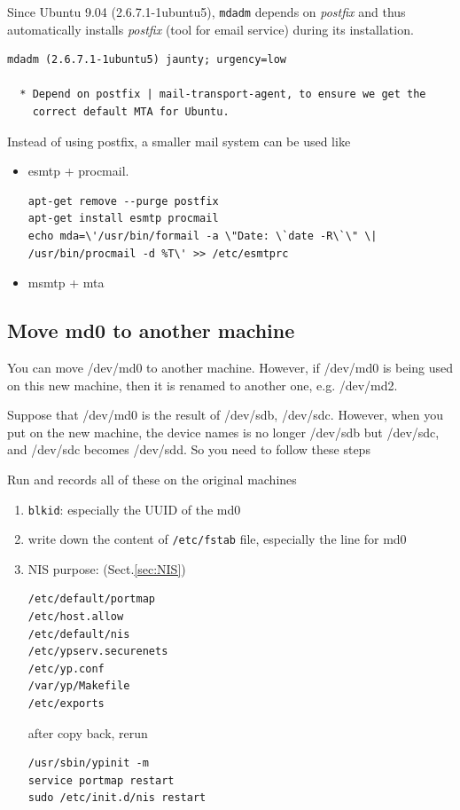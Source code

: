 Since Ubuntu 9.04 (2.6.7.1-1ubuntu5), \verb!mdadm! depends on {\it postfix} and
thus automatically installs {\it postfix} (tool for email service) during its
installation.
\begin{verbatim}
mdadm (2.6.7.1-1ubuntu5) jaunty; urgency=low

  * Depend on postfix | mail-transport-agent, to ensure we get the
    correct default MTA for Ubuntu.
\end{verbatim}
Instead of using postfix, a smaller mail system can be used like 
\begin{itemize}
  \item  esmtp + procmail. 
\begin{verbatim}
apt-get remove --purge postfix
apt-get install esmtp procmail
echo mda=\'/usr/bin/formail -a \"Date: \`date -R\`\" \| /usr/bin/procmail -d %T\' >> /etc/esmtprc
\end{verbatim}
  
    \item msmtp + mta
\end{itemize}


\subsection{Move md0 to another machine}

You can move /dev/md0 to another machine. However, if /dev/md0 is being used on
this new machine, then it is renamed to another one, e.g. /dev/md2.

Suppose that /dev/md0 is the result of /dev/sdb, /dev/sdc. However, when you put
on the new machine, the device names is no longer /dev/sdb but /dev/sdc, and
/dev/sdc becomes /dev/sdd. So you need to follow these steps


Run and records all of these on the original machines
\begin{enumerate}
  \item \verb!blkid!: especially the UUID of the md0
  \item write down the content of \verb!/etc/fstab! file, especially the line
  for md0  
  \item NIS purpose: (Sect.\ref{sec:NIS})
  
\begin{verbatim}
/etc/default/portmap
/etc/host.allow
/etc/default/nis
/etc/ypserv.securenets
/etc/yp.conf
/var/yp/Makefile
/etc/exports
\end{verbatim}  
after copy back, rerun 
\begin{verbatim}
/usr/sbin/ypinit -m
service portmap restart
sudo /etc/init.d/nis restart
\end{verbatim}
\end{enumerate}

